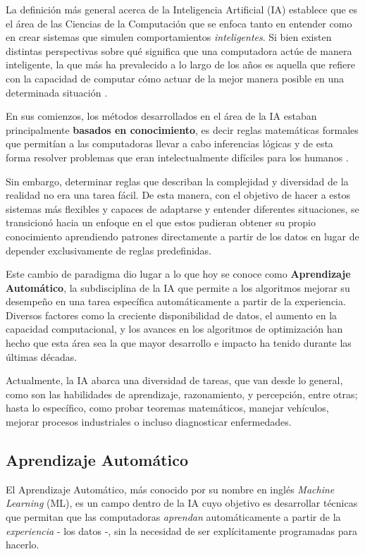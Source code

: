 \documentclass[../../main.tex]{subfiles}
\begin{document}
La definición más general acerca de la Inteligencia Artificial (IA) establece que es el área de las Ciencias de la Computación que se enfoca tanto en entender como en crear sistemas que simulen comportamientos \textit{inteligentes}. Si bien existen distintas perspectivas sobre qué significa que una computadora actúe de manera inteligente, la que más ha prevalecido a lo largo de los años es aquella que refiere con la capacidad de computar cómo actuar de la mejor manera posible en una determinada situación \cite{ai-a-modern-approach}. 

En sus comienzos, los métodos desarrollados en el área de la IA estaban principalmente \textbf{basados en conocimiento}, es decir reglas matemáticas formales que permitían a las computadoras llevar a cabo inferencias lógicas y de esta forma resolver problemas que eran intelectualmente difíciles para los humanos \cite{deep-learning}.

Sin embargo, determinar reglas que describan la complejidad y diversidad de la realidad no era una tarea fácil. De esta manera, con el objetivo de hacer a estos sistemas más flexibles y capaces de adaptarse y entender diferentes situaciones, se transicionó hacia un enfoque en el que estos pudieran obtener su propio conocimiento aprendiendo patrones directamente a partir de los datos en lugar de depender exclusivamente de reglas predefinidas.

Este cambio de paradigma dio lugar a lo que hoy se conoce como \textbf{Aprendizaje Automático}, la subdisciplina de la IA que permite a los algoritmos mejorar su desempeño en una tarea específica automáticamente a partir de la experiencia. Diversos factores como la creciente disponibilidad de datos, el aumento en la capacidad computacional, y los avances en los algoritmos de optimización \cite{deep-learning} han hecho que esta área sea la que mayor desarrollo e impacto ha tenido durante las últimas décadas. 

Actualmente, la IA abarca una diversidad de tareas, que van desde lo general, como son las habilidades de aprendizaje, razonamiento, y percepción, entre otras; hasta lo específico, como probar teoremas matemáticos, manejar vehículos, mejorar procesos industriales o incluso diagnosticar enfermedades.

\subsection{Aprendizaje Automático}
El Aprendizaje Automático, más conocido por su nombre en inglés \textit{Machine Learning} (ML), es un campo dentro de la IA cuyo objetivo es desarrollar técnicas que permitan que las computadoras \textit{aprendan} automáticamente a partir de la \textit{experiencia} - los datos -, sin la necesidad de ser explícitamente programadas para hacerlo.
\end{document}
